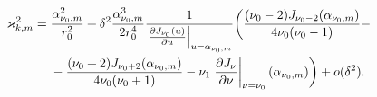 \begin{frame}
\begin{mytheorem}[B (продолжение)]

\begin{align*}
\varkappa_{k, m}^2 ={}& \frac{\alpha_{\nu_0, m}^2}{r_0^2} +  \delta^2 \frac{\alpha_{\nu_0, m}^3}{2 r_0^4}\frac{1}{ \left.\frac{\partial J_{\nu_0}(u)}{\partial u}\right|_{u=\alpha_{\nu_0, m}} }  
 \biggl(\frac{(\nu_0 - 2)J_{\nu_0-2}(\alpha_{\nu_0, m})   }{4\nu_0 (\nu_0-1)} -
\notag \\ 
&{}- \frac{(\nu_0 + 2)J_{\nu_0+2}(\alpha_{\nu_0, m})}{4\nu_0 (\nu_0+1)} 
- \nu_1 \left.\frac{\partial J_\nu}{\partial \nu}\right|_{\nu = \nu_0}(\alpha_{\nu_0, m})
    \biggr) + o(\delta^2).
\end{align*}

\end{mytheorem}

\end{frame} 

